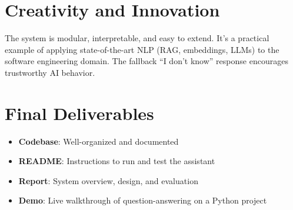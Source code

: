 \documentclass[11pt]{article}
\begin{document}
\section{Creativity and Innovation}
The system is modular, interpretable, and easy to extend. It’s a practical example of applying state-of-the-art NLP (RAG, embeddings, LLMs) to the software engineering domain. The fallback ``I don’t know'' response encourages trustworthy AI behavior.

\section{Final Deliverables}
\begin{itemize}[noitemsep]
  \item \textbf{Codebase}: Well-organized and documented
  \item \textbf{README}: Instructions to run and test the assistant
  \item \textbf{Report}: System overview, design, and evaluation
  \item \textbf{Demo}: Live walkthrough of question-answering on a Python project
\end{itemize}
\end{document}
